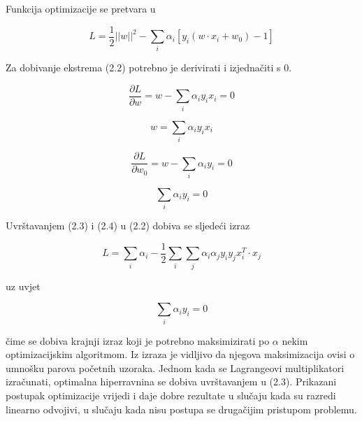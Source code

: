 \documentclass[times, utf8, zavrsni]{fer}
\begin{document}
Funkcija optimizacije se pretvara u

\begin{equation}
L = \frac{1}{2}\left| \left| w \right| \right|^2 - \sum_i \alpha_i \left[y_i \left(w \cdot x_i + w_0\right) - 1\right]
\end{equation}

Za dobivanje ekstrema (2.2) potrebno je derivirati i izjednačiti s 0.

\[
\frac{\partial L}{\partial w} = w - \sum_i \alpha_i y_i x_i = 0
\]

\begin{equation}
w = \sum_i \alpha_i y_i x_i
\end{equation}

\[
\frac{\partial L}{\partial w_0} = w - \sum_i \alpha_i y_i = 0
\]

\begin{equation}
\sum_i \alpha_i y_i = 0
\end{equation}

\bigbreak

Uvrštavanjem (2.3) i (2.4) u (2.2) dobiva se sljedeći izraz

\begin{equation}
L = \sum_i \alpha_i - \frac{1}{2} \sum_i \sum_j \alpha_i \alpha_j y_i y_j x_i^T \cdot x_j
\end{equation}

uz uvjet

\[
\sum_i \alpha_i y_i = 0
\]

čime se dobiva krajnji izraz koji je potrebno maksimizirati po \(\alpha\) nekim optimizacijskim
algoritmom. Iz izraza je vidljivo da njegova maksimizacija ovisi o umnošku parova početnih uzoraka. 
Jednom kada se Lagrangeovi multiplikatori izračunati, optimalna hiperravnina se dobiva 
uvrštavanjem u (2.3). Prikazani postupak optimizacije vrijedi i daje dobre rezultate u slučaju 
kada su razredi linearno odvojivi, u slučaju kada nisu postupa se drugačijim pristupom problemu.
\end{document}
